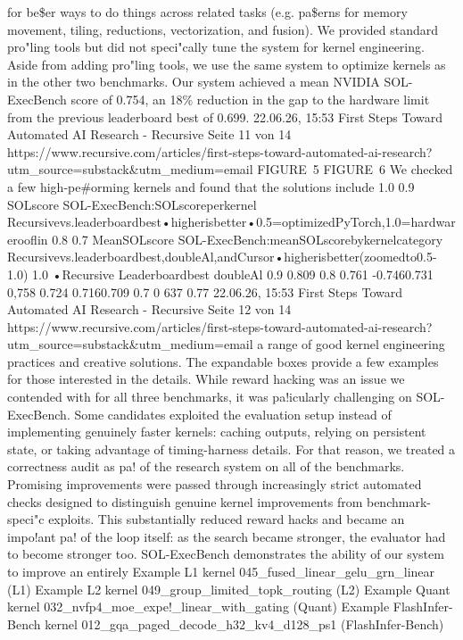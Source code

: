 for be\$er ways to do things across related tasks (e.g. pa\$erns for memory
movement, tiling, reductions, vectorization, and fusion). We provided standard
pro"ling tools but did not speci"cally tune the system for kernel engineering.
Aside from adding pro"ling tools, we use the same system to optimize
kernels as in the other two benchmarks.
Our system achieved a mean NVIDIA SOL-ExecBench score of 0.754, an 18\%
reduction in the gap to the hardware limit from the previous leaderboard
best of 0.699.
22.06.26, 15:53
First Steps Toward Automated AI Research - Recursive
Seite 11 von 14
https://www.recursive.com/articles/first-steps-toward-automated-ai-research?utm\_source=substack\&utm\_medium=email
FIGURE 5
FIGURE 6
We checked a few high-pe\#orming kernels and found that the solutions include
1.0
0.9
SOLscore
SOL-ExecBench:SOLscoreperkernel
Recursivevs.leaderboardbest•higherisbetter•0.5=optimizedPyTorch,1.0=hardwarerooflin
0.8
0.7
MeanSOLscore
SOL-ExecBench:meanSOLscorebykernelcategory
Recursivevs.leaderboardbest,doubleAl,andCursor•higherisbetter(zoomedto0.5-1.0)
1.0
•Recursive
Leaderboardbest
doubleAl
0.9
0.809
0.8
0.761
-0.7460.731
0,758
0.724
0.7160.709
0.7
0 637
0.77
22.06.26, 15:53
First Steps Toward Automated AI Research - Recursive
Seite 12 von 14
https://www.recursive.com/articles/first-steps-toward-automated-ai-research?utm\_source=substack\&utm\_medium=email
a range of good kernel engineering practices and creative solutions. The
expandable boxes provide a few examples for those interested in the details.
While reward hacking was an issue we contended with for all three benchmarks,
it was pa!icularly challenging on SOL-ExecBench. Some candidates exploited
the evaluation setup instead of implementing genuinely faster kernels:
caching outputs, relying on persistent state, or taking advantage of
timing-harness details.
For that reason, we treated a correctness audit as pa! of the research
system on all of the benchmarks. Promising improvements were passed
through increasingly strict automated checks designed to distinguish genuine
kernel improvements from benchmark-speci"c exploits. This substantially
reduced reward hacks and became an impo!ant pa! of the loop itself: as
the search became stronger, the evaluator had to become stronger too.
SOL-ExecBench demonstrates the ability of our system to improve an entirely
Example L1 kernel
045\_fused\_linear\_gelu\_grn\_linear (L1)
Example L2 kernel
049\_group\_limited\_topk\_routing (L2)
Example Quant kernel
032\_nvfp4\_moe\_expe!\_linear\_with\_gating (Quant)
Example FlashInfer-Bench kernel
012\_gqa\_paged\_decode\_h32\_kv4\_d128\_ps1 (FlashInfer-Bench)
